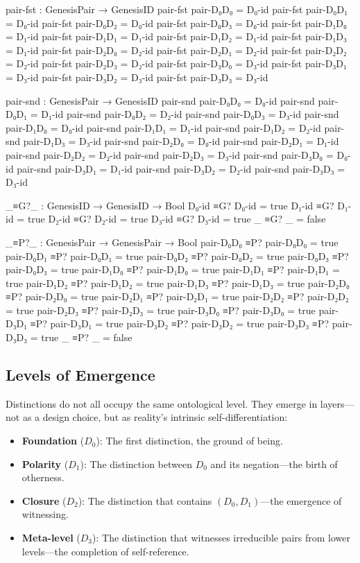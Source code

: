 \documentclass[11pt,a4paper]{book}
\begin{document}
\begin{code}
pair-fst : GenesisPair → GenesisID
pair-fst pair-D₀D₀ = D₀-id
pair-fst pair-D₀D₁ = D₀-id
pair-fst pair-D₀D₂ = D₀-id
pair-fst pair-D₀D₃ = D₀-id
pair-fst pair-D₁D₀ = D₁-id
pair-fst pair-D₁D₁ = D₁-id
pair-fst pair-D₁D₂ = D₁-id
pair-fst pair-D₁D₃ = D₁-id
pair-fst pair-D₂D₀ = D₂-id
pair-fst pair-D₂D₁ = D₂-id
pair-fst pair-D₂D₂ = D₂-id
pair-fst pair-D₂D₃ = D₂-id
pair-fst pair-D₃D₀ = D₃-id
pair-fst pair-D₃D₁ = D₃-id
pair-fst pair-D₃D₂ = D₃-id
pair-fst pair-D₃D₃ = D₃-id

pair-snd : GenesisPair → GenesisID
pair-snd pair-D₀D₀ = D₀-id
pair-snd pair-D₀D₁ = D₁-id
pair-snd pair-D₀D₂ = D₂-id
pair-snd pair-D₀D₃ = D₃-id
pair-snd pair-D₁D₀ = D₀-id
pair-snd pair-D₁D₁ = D₁-id
pair-snd pair-D₁D₂ = D₂-id
pair-snd pair-D₁D₃ = D₃-id
pair-snd pair-D₂D₀ = D₀-id
pair-snd pair-D₂D₁ = D₁-id
pair-snd pair-D₂D₂ = D₂-id
pair-snd pair-D₂D₃ = D₃-id
pair-snd pair-D₃D₀ = D₀-id
pair-snd pair-D₃D₁ = D₁-id
pair-snd pair-D₃D₂ = D₂-id
pair-snd pair-D₃D₃ = D₃-id

_≡G?_ : GenesisID → GenesisID → Bool
D₀-id ≡G? D₀-id = true
D₁-id ≡G? D₁-id = true
D₂-id ≡G? D₂-id = true
D₃-id ≡G? D₃-id = true
_     ≡G? _     = false

_≡P?_ : GenesisPair → GenesisPair → Bool
pair-D₀D₀ ≡P? pair-D₀D₀ = true
pair-D₀D₁ ≡P? pair-D₀D₁ = true
pair-D₀D₂ ≡P? pair-D₀D₂ = true
pair-D₀D₃ ≡P? pair-D₀D₃ = true
pair-D₁D₀ ≡P? pair-D₁D₀ = true
pair-D₁D₁ ≡P? pair-D₁D₁ = true
pair-D₁D₂ ≡P? pair-D₁D₂ = true
pair-D₁D₃ ≡P? pair-D₁D₃ = true
pair-D₂D₀ ≡P? pair-D₂D₀ = true
pair-D₂D₁ ≡P? pair-D₂D₁ = true
pair-D₂D₂ ≡P? pair-D₂D₂ = true
pair-D₂D₃ ≡P? pair-D₂D₃ = true
pair-D₃D₀ ≡P? pair-D₃D₀ = true
pair-D₃D₁ ≡P? pair-D₃D₁ = true
pair-D₃D₂ ≡P? pair-D₃D₂ = true
pair-D₃D₃ ≡P? pair-D₃D₃ = true
_         ≡P? _         = false

\end{code}

\subsection{Levels of Emergence}

Distinctions do not all occupy the same ontological level. They emerge in layers—not as a design choice, but as reality's intrinsic self-differentiation:
\begin{itemize}
\item \textbf{Foundation} ($D_0$): The first distinction, the ground of being.
\item \textbf{Polarity} ($D_1$): The distinction between $D_0$ and its negation—the birth of otherness.
\item \textbf{Closure} ($D_2$): The distinction that contains $(D_0, D_1)$—the emergence of witnessing.
\item \textbf{Meta-level} ($D_3$): The distinction that witnesses irreducible pairs from lower levels—the completion of self-reference.
\end{itemize}
\end{document}
